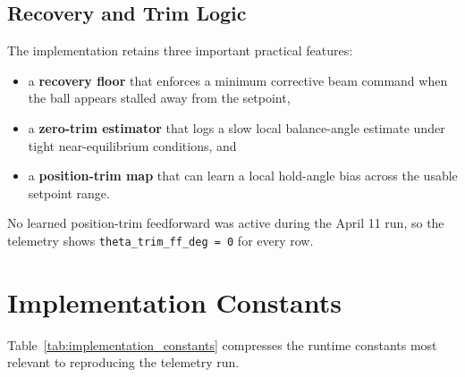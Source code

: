 \subsection{Recovery and Trim Logic}

The implementation retains three important practical features:

\begin{itemize}
  \item a \textbf{recovery floor} that enforces a minimum corrective beam command when
  the ball appears stalled away from the setpoint,
  \item a \textbf{zero-trim estimator} that logs a slow local balance-angle estimate
  under tight near-equilibrium conditions, and
  \item a \textbf{position-trim map} that can learn a local hold-angle bias across the
  usable setpoint range.
\end{itemize}

No learned position-trim feedforward was active during the April 11 run, so the
telemetry shows \verb|theta_trim_ff_deg = 0| for every row.

\section{Implementation Constants}

Table~\ref{tab:implementation_constants} compresses the runtime constants most relevant
to reproducing the telemetry run.

